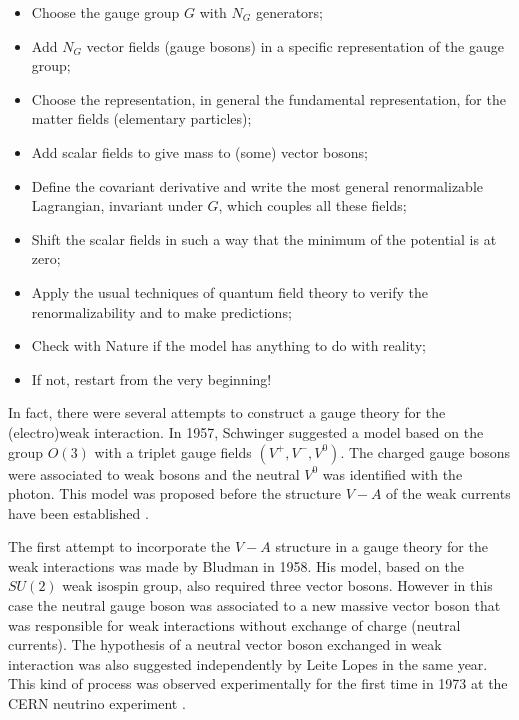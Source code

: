 \documentclass[12pt]{report}
\begin{document}
\begin{itemize}
\item Choose the gauge group $G$ with $N_G$ generators;

\item Add $N_G$ vector fields (gauge bosons) in a specific
representation of the gauge group;

\item Choose the representation, in general the fundamental
representation, for the matter fields (elementary particles);

\item Add scalar fields to give mass to (some) vector bosons;

\item Define the covariant derivative and write the most general
renormalizable Lagrangian, invariant under $G$, which couples all
these fields;

\item Shift the scalar fields in such a way that the minimum of the
potential is at zero;

\item Apply the usual techniques of quantum field theory to verify
the renormalizability and to make predictions;

\item Check with Nature if the model has anything to do with reality;

\item If not, restart from the very beginning!
\end{itemize}

In fact, there were several attempts to construct a gauge theory for
the (electro)weak interaction. In 1957, Schwinger \cite{Schwinger:57}
suggested a model based on the group $O(3)$ with a triplet gauge
fields  $(V^+, V^-, V^0)$. The charged gauge bosons were associated
to weak bosons and the neutral $V^0$ was identified with the photon.
This model was proposed before the structure $V-A$ of the weak
currents have been established \cite{Feynman:58,Marshak:58,Sakurai:58}. 

The first attempt to incorporate the $V-A$ structure in a gauge
theory for the weak interactions was made by Bludman
\cite{Bludman:58} in 1958. His model, based on the $SU(2)$ weak
isospin group, also required three vector bosons. However in this
case the neutral gauge boson was associated to a new massive vector
boson that was responsible for weak interactions without exchange of
charge (neutral currents). The  hypothesis of a neutral vector boson
exchanged in weak interaction was also suggested independently by
Leite Lopes \cite{Lopes:58} in the same year. This kind of process
was observed experimentally for the first time in 1973 at the CERN
neutrino experiment \cite{Hasert:73a}. 
\end{document}
